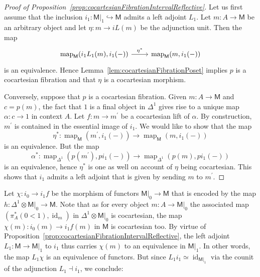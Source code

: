 \documentclass[reqno]{amsart}
\numberwithin{equation}{subsection}
\theoremstyle{plain}
\theoremstyle{definition}
\let\into=\hookrightarrow
\DeclareMathOperator{\id}{id}
\DeclareMathOperator{\Map}{map}
\newcommand{\map}[1]{\Map_{#1}}
\newcommand{\I}[1]{\mathsf{#1}}
\begin{document}
\begin{proof}[{Proof of Proposition~\ref{prop:cocartesianFibrationIntervalReflective}}]
	Let us first assume that the inclusion $i_1\colon \I{M}\vert_1\into\I{M}$ admits a left adjoint $L_1$. Let $m\colon A\to\I{M}$ be an arbitrary object and let $\eta\colon m\to iL(m)$ be the adjunction unit. Then the map
	\begin{equation*}
		\begin{tikzcd}
		\map{\I{M}}(i_1L_1(m),i_1(-))\arrow[r, "\eta^\ast"] & \map{\I{M}}(m,i_1(-))
		\end{tikzcd}
	\end{equation*}
	is an equivalence. Hence Lemma~\ref{lem:cocartesianFibrationPoset} implies $p$ is a cocartesian fibration and that $\eta$ is a cocartesian morphism.
	
	Conversely, suppose that $p$ is a cocartesian fibration. Given $m\colon A\to \I{M}$ and $c=p(m)$, the fact that $1$ is a final object in $\Delta^1$ gives rise to a unique map $\alpha \colon c\to 1$ in context $A$. Let $f\colon m\to m^\prime$ be a cocartesian lift of $\alpha$. By construction, $m^\prime$ is contained in the essential image of $i_1$. We would like to show that the map
	\begin{equation*}
	\eta^\ast\colon\map{\I{M}}(m^\prime,i_1(-))\to\map{\I{M}}(m,i_1(-))
	\end{equation*}
	is an equivalence. But the map
	\begin{equation*}
		 \alpha^\ast\colon \map{\Delta^1}(p( m^\prime),pi_1(-))\to\map{\Delta^1}(p(m),pi_1(-))
	\end{equation*}
	 is an equivalence, hence $\eta^\ast$ is one as well on account of $\eta$ being cocartesian. This shows that $i_1$ admits a left adjoint that is given by sending $m$ to $m^\prime$.
\end{proof}
Let $\chi\colon i_0\to i_1 f$ be the morphism of functors $\I{M}\vert_0\to\I{M}$ that is encoded by the map $h\colon\Delta^1\otimes\I{M}\vert_0\to\I{M}$. Note that as for every object $m\colon A\to\I{M}\vert_0$ the associated map $(\pi_A^\ast(0<1),\id_m)$ in $\Delta^1\otimes\I{M}\vert_0$ is cocartesian, the map $\chi(m)\colon i_0(m)\to i_1 f(m)$ in $\I{M}$ is cocartesian too. 
By virtue of Proposition~\ref{prop:cocartesianFibrationIntervalReflective}, the left adjoint $L_1\colon\I{M}\to\I{M}\vert_1$ to $i_1$ thus carries $\chi(m)$ to an equivalence in $\I{M}\vert_1$. In other words, the map $L_1\chi$ is an equivalence of functors. But since $L_1 i_1\simeq \id_{\I{M}\vert_1}$ via the counit of the adjunction $L_1\dashv i_1$, we conclude:
\end{document}
